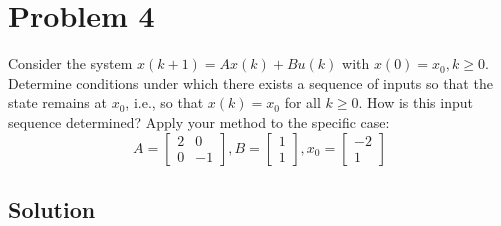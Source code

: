 \section*{Problem 4}

Consider the system \( x(k+1)=A x(k)+B u(k) \) with \( x(0)=x_{0}, k \geq 0 \).
Determine conditions under which there exists a sequence of inputs so that the state remains at \( x_{0} \), i.e., so that \( x(k)=x_{0} \) for all \( k \geq 0 \).
How is this input sequence determined?
Apply your method to the specific case:
\[
    A=\left[\begin{array}{cc}
            2 & 0  \\
            0 & -1
        \end{array}\right], B=\left[\begin{array}{l}
            1 \\
            1
        \end{array}\right], x_{0}=\left[\begin{array}{c}
            -2 \\
            1
        \end{array}\right]
\]

\subsection*{Solution}
